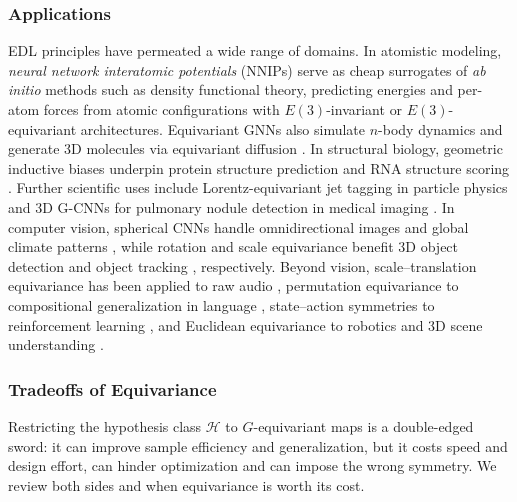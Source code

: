 \documentclass[mathematics,review,submit,moreauthors]{Definitions/mdpi}
\begin{document}
\subsubsection{Applications}
EDL principles have permeated a wide range of domains.
In atomistic modeling, \emph{neural network interatomic potentials} (NNIPs) serve as cheap surrogates of \textit{ab initio} methods such as density functional theory, predicting energies and per-atom forces from atomic configurations with $E(3)$-invariant \citep{schutt2017anips} or $E(3)$-equivariant \citep{batzner2022nc,liao2022,liao2023,passaro2023} architectures.
Equivariant GNNs also simulate $n$-body dynamics \citep{satorras2021p3icml} and generate 3D molecules via equivariant diffusion \citep{cornet2024}.
In structural biology, geometric inductive biases underpin protein structure prediction \citep{jumper2021na,baek2021s} and RNA structure scoring \citep{townshend2021s}.
Further scientific uses include Lorentz-equivariant jet tagging in particle physics \citep{bogatskiy2020p3icml} and 3D G-CNNs for pulmonary nodule detection in medical imaging \citep{winkels2019mia}.
In computer vision, spherical CNNs handle omnidirectional images and global climate patterns \citep{cohen2018,cohen2019p3icml}, while rotation and scale equivariance benefit 3D object detection \citep{yu2022} and object tracking \citep{sosnovik2021}, respectively.
Beyond vision, scale--translation equivariance has been applied to raw audio \citep{romero2023tmlr}, permutation equivariance to compositional generalization in language \citep{gordon2020}, state--action symmetries to reinforcement learning \citep{vanderpol2020anips}, and Euclidean equivariance to robotics and 3D scene understanding \citep{seo2025a,fei2024air}.



\subsubsection{Tradeoffs of Equivariance}\label{sec:edl-tradeoffs}
Restricting the hypothesis class $\mathcal{H}$ to $G$-equivariant maps is a double-edged sword: it can improve sample efficiency and generalization, but it costs speed and design effort, can hinder optimization and can impose the wrong symmetry.
We review both sides and when equivariance is worth its cost.
\end{document}
